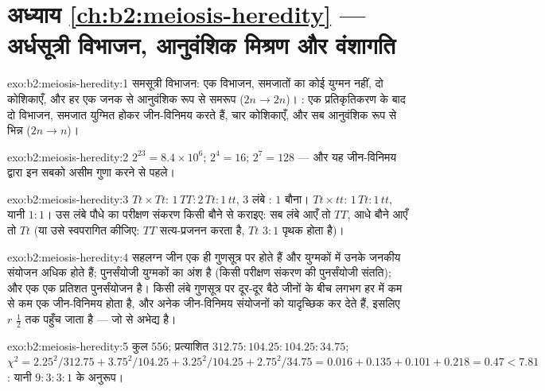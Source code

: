 \section*{अध्याय \ref{ch:b2:meiosis-heredity} --- अर्धसूत्री विभाजन, आनुवंशिक मिश्रण और वंशागति}

\begin{solution}{exo:b2:meiosis-heredity:1}
समसूत्री विभाजन: एक विभाजन, समजातों का कोई युग्मन नहीं, दो कोशिकाएँ, और
हर एक जनक से आनुवंशिक रूप से समरूप ($2n \to 2n$)। : एक
प्रतिकृतिकरण के बाद दो विभाजन, समजात युग्मित होकर जीन-विनिमय करते हैं,
चार कोशिकाएँ,  और सब आनुवंशिक रूप से भिन्न ($2n \to n$)।
\end{solution}

\begin{solution}{exo:b2:meiosis-heredity:2}
$2^{23} = 8.4\times 10^{6}$; $2^{4} = 16$; $2^{7} = 128$ --- और यह
जीन-विनिमय द्वारा इन सबको असीम गुणा करने से पहले।
\end{solution}

\begin{solution}{exo:b2:meiosis-heredity:3}
$Tt\times Tt$:  $1\,TT : 2\,Tt : 1\,tt$,  $3$ लंबे
: $1$ बौना। $Tt\times tt$: $1\,Tt : 1\,tt$, यानी $1 : 1$। उस लंबे पौधे
का परीक्षण संकरण किसी बौने से कराइए: सब लंबे आएँ तो $TT$, आधे बौने आएँ
तो $Tt$ (या उसे स्वपरागित कीजिए: $TT$ सत्य-प्रजनन करता है, $Tt$ $3 : 1$ पृथक होता है)।
\end{solution}

\begin{solution}{exo:b2:meiosis-heredity:4}
सहलग्न जीन एक ही गुणसूत्र पर होते हैं और युग्मकों में उनके जनकीय
 संयोजन अधिक होते हैं;  पुनर्संयोजी युग्मकों का अंश है (किसी परीक्षण संकरण की
पुनर्संयोजी संतति); और एक  एक प्रतिशत
पुनर्संयोजन है। किसी लंबे गुणसूत्र पर दूर-दूर बैठे जीनों के बीच लगभग हर
 में कम से कम एक जीन-विनिमय होता है, और अनेक
जीन-विनिमय संयोजनों को यादृच्छिक कर देते हैं, इसलिए $r$ $\tfrac12$ तक
पहुँच जाता है --- जो  से अभेद्य है।
\end{solution}

\begin{solution}{exo:b2:meiosis-heredity:5}
कुल 556; प्रत्याशित $312.75 : 104.25 : 104.25 : 34.75$; $\chi^2 =
2.25^2/312.75 + 3.75^2/104.25 + 3.25^2/104.25 + 2.75^2/34.75 = 0.016
+ 0.135 + 0.101 + 0.218 = 0.47 < 7.81$: यानी $9 : 3 : 3 :
1$ के अनुरूप।
\end{solution}

